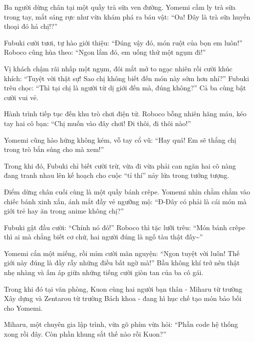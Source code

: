 \documentclass[../main.tex]{subfiles}
\begin{document}
\il


Ba người dừng chân tại một quầy trà sữa ven đường. Yomemi cầm ly trà sữa trong tay, mắt sáng rực như vừa khám phá ra báu vật: ``Oa! Đây là trà sữa huyền thoại đó hả chị!?''

Fubuki cười tươi, tự hào giới thiệu: ``Đúng vậy đó, món ruột của bọn em luôn!''
Roboco cũng hùa theo: ``Ngon lắm đó, em uống thử một ngụm đi!''

Vị khách chậm rãi nhấp một ngụm, đôi mắt mở to ngạc nhiên rồi cười khúc khích: ``Tuyệt vời thật sự! Sao chị không biết đến món này sớm hơn nhỉ?''
Fubuki trêu chọc: ``Thì tại chị là người từ dị giới đến mà, đúng không?'' Cả ba cùng bật cười vui vẻ.

\il


Hành trình tiếp tục đến khu trò chơi điện tử. Roboco bỗng nhiên hăng máu, kéo tay hai cô bạn: ``Chị muốn vào đây chơi! Đi thôi, đi thôi nào!''

Yomemi cũng hào hứng không kém, vỗ tay cổ vũ: ``Hay quá! Em sẽ thắng chị trong trò bắn súng cho mà xem!''

Trong khi đó, Fubuki chỉ biết cười trừ, vừa đi vừa phải can ngăn hai cô nàng đang tranh nhau lên kế hoạch cho cuộc ``tỉ thí'' nảy lửa trong tưởng tượng.

\il


Điểm dừng chân cuối cùng là một quầy bánh crêpe. Yomemi nhìn chằm chằm vào chiếc bánh xinh xắn, ánh mắt đầy vẻ ngưỡng mộ: ``Đ-Đây có phải là cái món mà giới trẻ hay ăn trong anime không chị?''

Fubuki gật đầu cười: ``Chính nó đó!''
Roboco thì tặc lưỡi trêu: ``Món bánh crêpe thì ai mà chẳng biết cơ chứ, hai người đúng là ngố tàu thật đấy\~{}''

Yomemi cắn một miếng, rồi mỉm cười mãn nguyện: ``Ngon tuyệt vời luôn! Thế giới này đúng là đầy rẫy những điều bất ngờ mà!'' Bầu không khí trở nên thật nhẹ nhàng và ấm áp giữa những tiếng cười giòn tan của ba cô gái.

\ct

Trong khi đó tại văn phòng, Kuon cùng hai người bạn thân - Miharu từ trường Xây dựng và Zentarou từ trường Bách khoa - đang hì hục chế tạo món bảo bối cho Yomemi.

Miharu, một chuyên gia lập trình, vừa gõ phím vừa hỏi: ``Phần code hệ thống xong rồi đây. Còn phần khung sắt thế nào rồi Kuon?''
\end{document}
